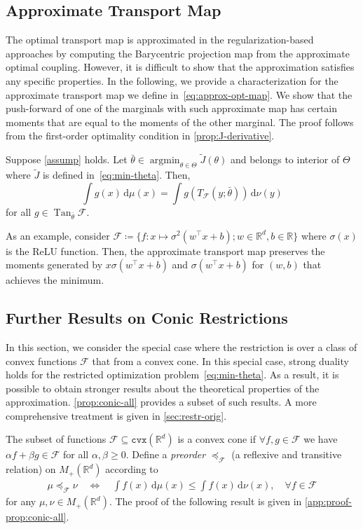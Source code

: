 \documentclass[10pt]{article}
\newcommand{\ud}{\,\mathrm{d}}
\newcommand{\op}[1]{\operatorname{#1}}
\newcommand{\Tan}{\op{Tan}}
\renewcommand{\tilde}{\widetilde}
\newcommand{\cvx}{\mathtt{cvx}}
\newcommand{\real}{\mathbb{R}}
\newcommand{\argmin}{\mathop{\operatorname{argmin}}}
\newcommand{\calF}{\mathcal{F}}
\numberwithin{equation}{section}
\begin{document}
\subsection{Approximate Transport Map}\label{sec:approx-map}
The optimal transport map is approximated in the regularization-based approaches \citep{seguy2017large} by computing the Barycentric projection map from the approximate optimal coupling. However, it is difficult to show that the approximation satisfies any specific properties. In the following, we provide a characterization for the approximate transport map we define in~\eqref{eq:approx-opt-map}. We show that the push-forward of one of the marginals with such approximate map has certain moments that are equal to the moments of the other marginal. The proof follows from the first-order optimality condition in \autoref{prop:J-derivative}.
\begin{theorem}\label{prop:approximate-map}
	Suppose \autoref{assump} holds. Let $\bar{\theta} \in \argmin_{\theta\in \Theta}\tilde{J}(\theta)$ and belongs to interior of $\Theta$ where $\tilde{J}$ is defined in~\eqref{eq:min-theta}. Then,
	\begin{equation*}
	\int g(x) \ud \mu(x) = \int g(T_\calF(y; \bar\theta))\ud \nu(y)
	\end{equation*}
	for all $g \in \Tan_{\bar{\theta}}\calF$. 
\end{theorem}
As an example, consider $\calF\coloneqq \{f:x\mapsto \sigma^2(w^\top x + b); w \in \real^d, b\in \real \}$ where $\sigma(x)$ is the ReLU function. Then, the approximate transport map preserves the moments generated by $x\sigma(w^\top x + b)$ and $\sigma(w^\top x + b)$ for $(w,b)$ that achieves the minimum. 

\subsection{Further Results on Conic Restrictions}\label{sec:conic-summary}
In this section, we consider the special case where the restriction is over a class of convex functions $\calF$ that from a convex cone. In this special case, strong duality holds for the restricted optimization problem~\eqref{eq:min-theta}. As a result, it is possible to obtain stronger results about the theoretical properties of the approximation. \autoref{prop:conic-all} provides a subset of such results. A more comprehensive treatment is given in \autoref{sec:restr-orig}.

The subset of functions $\calF \subseteq \cvx(\real^d)$ is a convex cone if $\forall f, g \in \calF$ we have $\alpha f + \beta g \in \calF$ for all $\alpha,\beta \geq 0$. Define a {\em preorder} $\preceq_\calF$ (a reflexive and transitive relation) on $M_+(\real^d)$ according to
\begin{align*}%
\mu \preceq_\calF {\nu} \quad \Leftrightarrow\quad \int f(x) \ud \mu(x) \leq \int f(x) \ud {\nu}(x),\quad \forall f \in \calF
\end{align*}
for any $\mu,\nu \in M_+(\real^d)$. The proof of the following result is given in \autoref{app:proof-prop:conic-all}. 
\end{document}
